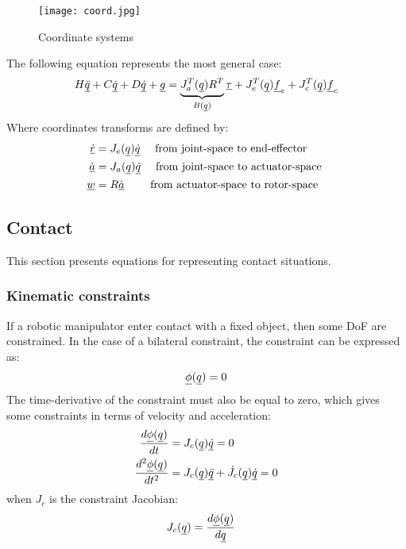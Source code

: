 %
\begin{figure}[t]
	\centering
		\texttt{[image: coord.jpg]}
	\caption{Coordinate systems}%
	\label{fig:coord}
\end{figure}
%
The following equation represents the most general case:
%
\begin{align}
H \underline{\ddot{q}} + C \underline{\dot{q}} + D \underline{\dot{q}} + \underline{g} =  \underbrace{ J_a^T(\underline{q}) R^T }_{B(\underline{q})}  \underline{\tau} + J_e^T(\underline{q}) \underline{f}_e + J_c^T(\underline{q}) \underline{f}_c
\label{eq:manipulator_gen}
\end{align}
%
Where coordinates transforms are defined by:
%
\begin{align}
\underline{\dot{r}}   &= J_e( \underline{q} ) \underline{\dot{q} }  \quad \text{ from joint-space to end-effector   } \\
\underline{\dot{a}}   &= J_a( \underline{q} ) \underline{\dot{q} }  \quad \text{ from joint-space to actuator-space } \\
\underline{w }        &= R              \underline{\dot{a} }  \quad\quad \text{ from actuator-space to rotor-space } 
\label{eq:coord_transform2}
\end{align}
%

\newpage
\subsection{Contact}
\label{sec:contact}

This section presents equations for representing contact situations.

\subsubsection{Kinematic constraints}
\label{sec:constraints}
%
If a robotic manipulator enter contact with a fixed object, then some DoF are constrained. In the case of a bilateral constraint, the constraint can be expressed as:
\begin{align}
\underline{\phi}( \underline{ q } ) = 0
\label{eq:constraint}
\end{align}
%
The time-derivative of the constraint must also be equal to zero, which gives some constraints in terms of velocity and acceleration:
\begin{align}
\frac{d \underline{\phi}( \underline{ q } ) }{dt}     &= J_c( \underline{ q } ) \underline{\dot{q}}  = 0 \\
\frac{d^2 \underline{\phi}( \underline{ q } ) }{dt^2} &= J_c( \underline{ q } ) \underline{\ddot{q}}  + \dot{J}_c( \underline{ q } ) \underline{\dot{q}} = 0 
\label{eq:constraint_diff}
\end{align}
%
when $J_c$ is the constraint Jacobian:
%
\begin{align}
J_c( \underline{ q } )                    &= \frac{d \underline{\phi}( \underline{ q } ) }{d\underline{ q }}
\label{eq:constraint_jaco}
\end{align}

